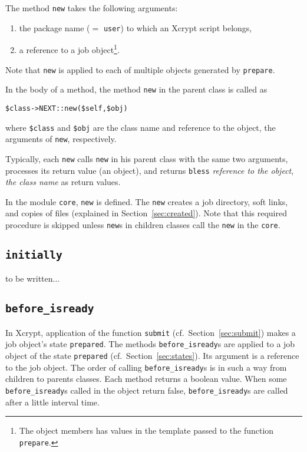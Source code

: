 \documentclass[a4paper,10pt]{report}
\def\|{\verb|} %|
\begin{document}
The method \|new| takes the following arguments:
\begin{enumerate}
\item the package name ($=$ \|user|) to which an Xcrypt script belongs,
\item a reference to a job object\footnote{The object members has
      values in the template passed to the function \texttt{prepare}.}.
\end{enumerate}
Note that \|new| is applied to each of multiple objects
generated by \|prepare|.

In the body of a method, the method \|new| in the parent class is
called as
\begin{center}
 \|$class->NEXT::new($self,$obj)| %
\end{center}
where \|$class| and \|$obj| are the class name and reference to the
object, the arguments of \|new|, respectively.

Typically, each \|new| calls \|new| in his parent class with the same
two arguments, processes its return value (an object), and returns
\|bless| \textit{reference to the object},
\textit{the class name} as return values.

In the module \|core|, \|new| is defined.  The \|new| creates a job
directory, soft links, and copies of files (explained in
Section~\ref{sec:created}).  Note that this required procedure is
skipped unless \|new|s in children classes call the \|new| in the
\|core|.

\subsection{\texttt{initially}}
to be written...

\subsection{\texttt{before\_isready}}

In Xcrypt, application of the function \|submit| (cf.\
Section~\ref{sec:submit}) makes a job object's state \|prepared|.  The
methods \texttt{before\_isready}s are applied to a job object of the
state \|prepared| (cf.\ Section~\ref{sec:states}).  Its argument is a
reference to the job object.  The order of calling
\texttt{before\_isready}s is in such a way from children to parents
classes.  Each method returns a boolean value.  When some
\texttt{before\_isready}s called in the object return false,
\texttt{before\_isready}s are called after a little interval time.
\end{document}

